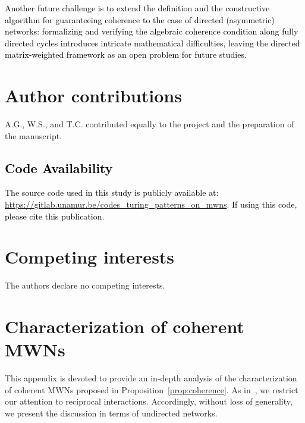 \documentclass[aps,showpacs,preprintnumbers,amsmath,amssymb,twocolumn,superscriptaddress,floatfix,nofootinbib,10pt,pre]{revtex4-1}
\begin{document}
\textcolor{black}{Another future challenge is to extend the definition and the constructive algorithm for guaranteeing coherence to the case of directed (asymmetric) networks: formalizing and verifying the algebraic coherence condition along fully directed cycles introduces intricate mathematical difficulties, leaving the directed matrix-weighted framework as an open problem for future studies.}


\section*{Author contributions}
A.G., W.S., and T.C. contributed equally to the project and the preparation of the manuscript.


\textcolor{black}{
\section*{Code Availability}
The source code used in this study is publicly available at: \url{https://gitlab.unamur.be/codes_turing_patterns_on_mwns}. If using this code, please cite this publication.}

\section*{Competing interests}
The authors declare no competing interests.



\clearpage

\onecolumngrid

\appendix

\section{Characterization of coherent MWNs}\label{app:coherence}

This appendix is devoted to provide an in-depth analysis of the characterization of coherent MWNs proposed in Proposition~\ref{prop:coherence}. As in~\cite{tian2025matrix}, we restrict our attention to reciprocal interactions. Accordingly, without loss of generality, we present the discussion in terms of undirected networks.
\end{document}
